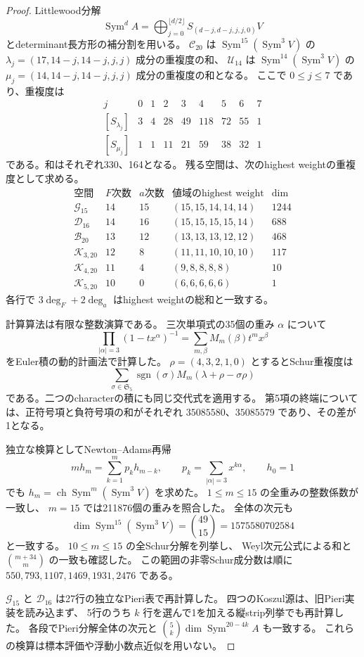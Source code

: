 \documentclass[a4paper,11pt]{ltjsarticle}
\theoremstyle{definition}
\begin{document}
\begin{proof}
Littlewood分解
\[
\operatorname{Sym}^d A=
 \bigoplus_{j=0}^{\lfloor d/2\rfloor}S_{(d-j,d-j,j,j,0)}V
\]
とdeterminant長方形の補分割を用いる。
$\mathcal C_{20}$ は $\operatorname{Sym}^{15}(\operatorname{Sym}^3V)$ の
$\lambda_j=(17,14-j,14-j,j,j)$ 成分の重複度の和、
$\mathcal U_{14}$ は $\operatorname{Sym}^{14}(\operatorname{Sym}^3V)$ の
$\mu_j=(14,14-j,14-j,j,j)$ 成分の重複度の和となる。
ここで $0\le j\le7$ であり、重複度は
\[
\begin{array}{c|rrrrrrrr}
j&0&1&2&3&4&5&6&7\\\hline
[S_{\lambda_j}]&3&4&28&49&118&72&55&1\\
{}[S_{\mu_j}]&1&1&11&21&59&38&32&1
\end{array}
\]
である。和はそれぞれ330、164となる。
残る空間は、次のhighest weightの重複度として求める。
\[
\begin{array}{c|rr|c|r}
\text{空間}&F\text{次数}&a\text{次数}&\text{値域のhighest weight}&\dim\\\hline
\mathcal G_{15}&14&15&(15,15,14,14,14)&1244\\
\mathcal D_{16}&14&16&(15,15,15,15,14)&688\\
\mathcal B_{20}&13&12&(13,13,13,12,12)&468\\
\mathcal K_{3,20}&12&8&(11,11,10,10,10)&117\\
\mathcal K_{4,20}&11&4&(9,8,8,8,8)&10\\
\mathcal K_{5,20}&10&0&(6,6,6,6,6)&1
\end{array}
\]
各行で $3\deg_F+2\deg_a$ はhighest weightの総和と一致する。

計算算法は有限な整数演算である。
三次単項式の35個の重み $\alpha$ について
\[
 \prod_{|\alpha|=3}(1-tx^\alpha)^{-1}
  =\sum_{m,\beta}M_m(\beta)t^mx^\beta
\]
をEuler積の動的計画法で計算した。
$\rho=(4,3,2,1,0)$ とするとSchur重複度は
\[
 \sum_{\sigma\in\mathfrak S_5}\operatorname{sgn}(\sigma)
 M_m(\lambda+\rho-\sigma\rho)
\]
である。二つのcharacterの積にも同じ交代式を適用する。
第5項の終端については、正符号項と負符号項の和がそれぞれ
$35085580$、$35085579$ であり、その差が1となる。

独立な検算としてNewton--Adams再帰
\[
 mh_m=\sum_{k=1}^m p_kh_{m-k},\qquad
 p_k=\sum_{|\alpha|=3}x^{k\alpha},\qquad h_0=1
\]
でも $h_m=\operatorname{ch}\operatorname{Sym}^m(\operatorname{Sym}^3V)$ を求めた。
$1\le m\le15$ の全重みの整数係数が一致し、
$m=15$ では211876個の重みを照合した。
全体の次元も
\[
 \dim\operatorname{Sym}^{15}(\operatorname{Sym}^3V)
 =\binom{49}{15}=1575580702584
\]
と一致する。
$10\le m\le15$ の全Schur分解を列挙し、
Weyl次元公式による和と $\binom{m+34}{m}$ の一致も確認した。
この範囲の非零Schur成分数は順に
$550,793,1107,1469,1931,2476$ である。

$\mathcal G_{15}$ と $\mathcal D_{16}$ は27行の独立なPieri表で再計算した。
四つのKoszul源は、旧Pieri実装を読み込まず、
5行のうち $k$ 行を選んで1を加える縦strip列挙でも再計算した。
各段でPieri分解全体の次元と
$\binom5k\dim\operatorname{Sym}^{20-4k}A$ も一致する。
これらの検算は標本評価や浮動小数点近似を用いない。
\end{proof}
\end{document}
